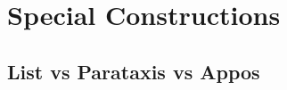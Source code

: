 \documentclass[11pt,a4paper]{article}
\begin{document}
%


\section{Special Constructions}

\subsection{List vs Parataxis vs Appos}
\end{document}
